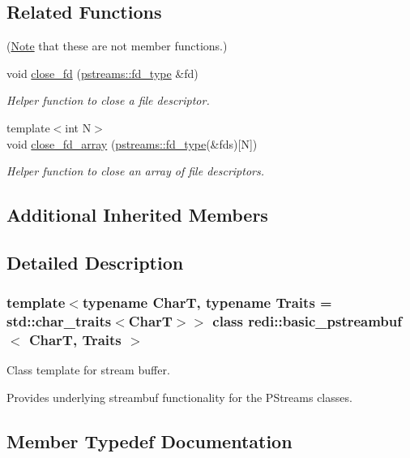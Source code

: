 \subsection*{Related Functions}
(\mbox{\hyperlink{classNote}{Note}} that these are not member functions.) \begin{DoxyCompactItemize}
\item 
void \mbox{\hyperlink{classredi_1_1basic__pstreambuf_a1f07c96f98013de48578043f0caa0e82}{close\+\_\+fd}} (\mbox{\hyperlink{structredi_1_1pstreams_add0b7eaed16eb6c22a56012958d85b1d}{pstreams\+::fd\+\_\+type}} \&fd)
\begin{DoxyCompactList}\small\item\em Helper function to close a file descriptor. \end{DoxyCompactList}\item 
{\footnotesize template$<$int N$>$ }\\void \mbox{\hyperlink{classredi_1_1basic__pstreambuf_a8b7a0d3e1009028f3f6af0fe96a9743e}{close\+\_\+fd\+\_\+array}} (\mbox{\hyperlink{structredi_1_1pstreams_add0b7eaed16eb6c22a56012958d85b1d}{pstreams\+::fd\+\_\+type}}(\&fds)\mbox{[}N\mbox{]})
\begin{DoxyCompactList}\small\item\em Helper function to close an array of file descriptors. \end{DoxyCompactList}\end{DoxyCompactItemize}
\subsection*{Additional Inherited Members}


\subsection{Detailed Description}
\subsubsection*{template$<$typename CharT, typename Traits = std\+::char\+\_\+traits$<$\+Char\+T$>$$>$\newline
class redi\+::basic\+\_\+pstreambuf$<$ Char\+T, Traits $>$}

Class template for stream buffer. 

Provides underlying streambuf functionality for the P\+Streams classes. 

\subsection{Member Typedef Documentation}
\mbox{\label{classredi_1_1basic__pstreambuf_aaa33e67df3b5330b2d29f8ceca3d9a15}} 
